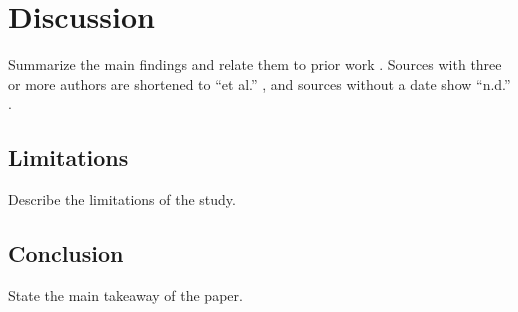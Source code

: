 \section{Discussion}

Summarize the main findings and relate them to prior work
\parencite{smith2021,garcia2018}. Sources with three or more authors
are shortened to \enquote{et al.} \parencite{kim2017}, and sources
without a date show \enquote{n.d.} \parencite{unesco}.

\subsection{Limitations}

Describe the limitations of the study.

\subsection{Conclusion}

State the main takeaway of the paper.
